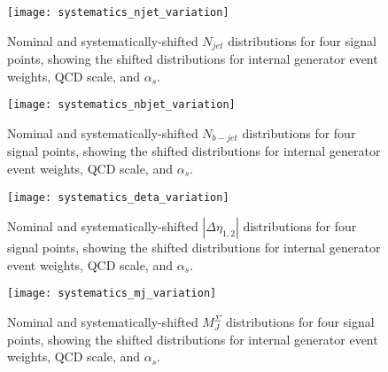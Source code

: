 \begin{figure}[!ht]
    \centering
    \texttt{[image: systematics\_njet\_variation]}
    \caption{Nominal and systematically-shifted $N_{jet}$ distributions for four signal points, showing the shifted distributions for internal generator event weights, QCD scale, and $\alpha_{s}$.}
    \label{fig:systematics_njet}
\end{figure}

\begin{figure}[!ht]
    \centering
    \texttt{[image: systematics\_nbjet\_variation]}
    \caption{Nominal and systematically-shifted $N_{b-jet}$ distributions for four signal points, showing the shifted distributions for internal generator event weights, QCD scale, and $\alpha_{s}$.}
    \label{fig:systematics_nbjet}
\end{figure}

\begin{figure}[!ht]
    \centering
    \texttt{[image: systematics\_deta\_variation]}
    \caption{Nominal and systematically-shifted $|\Delta\eta_{1,2}|$ distributions for four signal points, showing the shifted distributions for internal generator event weights, QCD scale, and $\alpha_{s}$.}
    \label{fig:systematics_deta}
\end{figure}

\begin{figure}[!ht]
    \centering
    \texttt{[image: systematics\_mj\_variation]}
    \caption{Nominal and systematically-shifted $M_{J}^{\Sigma}$ distributions for four signal points, showing the shifted distributions for internal generator event weights, QCD scale, and $\alpha_{s}$.}
    \label{fig:systematics_mj}
\end{figure}

